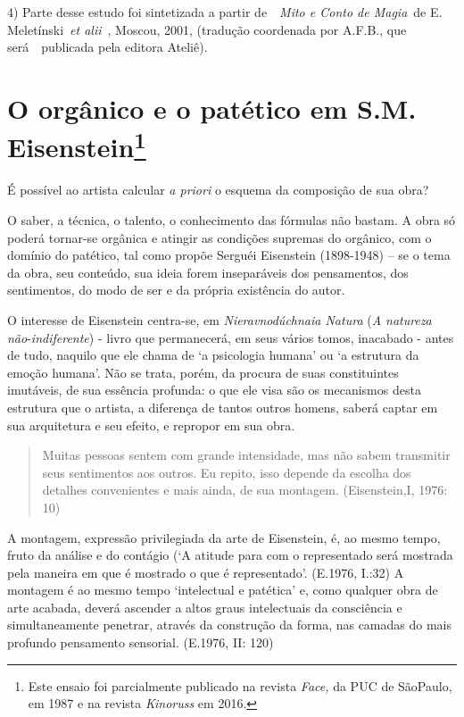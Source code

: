 4) Parte desse estudo foi sintetizada a partir de~~\emph{Mito e Conto de
Magia}~de E. Meletínski~\emph{et alii}~, Moscou, 2001, (tradução
coordenada por A.F.B., que será~~publicada pela editora Ateliê).

\chapter{O orgânico e o patético em S.M. Eisenstein\footnote{Este ensaio
  foi parcialmente publicado na revista \emph{Face,} da PUC de SãoPaulo,
  em 1987 e na revista \emph{Kinoruss} em 2016.}}

É possível ao artista calcular \emph{a priori} o esquema da composição
de sua obra?

O saber, a técnica, o talento, o conhecimento das fórmulas não bastam. A
obra só poderá tornar-se orgânica e atingir as condições supremas do
orgânico, com o domínio do patético, tal como propõe Serguéi Eisenstein
(1898-1948) -- se o tema da obra, seu conteúdo, sua ideia forem
inseparáveis dos pensamentos, dos sentimentos, do modo de ser e da
própria existência do autor.

O interesse de Eisenstein centra-se, em \emph{Nieravnodúchnaia Natura}
(\emph{A natureza não}-\emph{indiferente}) - livro que permanecerá, em
seus vários tomos, inacabado - antes de tudo, naquilo que ele chama de
`a psicologia humana' ou `a estrutura da emoção humana'. Não se trata,
porém, da procura de suas constituintes imutáveis, de sua essência
profunda: o que ele visa são os mecanismos desta estrutura que o
artista, a diferença de tantos outros homens, saberá captar em sua
arquitetura e seu efeito, e repropor em sua obra.

\begin{quote}
Muitas pessoas sentem com grande intensidade, mas não sabem transmitir
seus sentimentos aos outros. Eu repito, isso depende da escolha dos
detalhes convenientes e mais ainda, de sua montagem. (Eisenstein,I,
1976: 10)
\end{quote}

A montagem, expressão privilegiada da arte de Eisenstein, é, ao mesmo
tempo, fruto da análise e do contágio (`A atitude para com o
representado será mostrada pela maneira em que é mostrado o que é
representado'. (E.1976, I.:32) A montagem é ao mesmo tempo `intelectual
e patética' e, como qualquer obra de arte acabada, deverá ascender a
altos graus intelectuais da consciência e simultaneamente penetrar,
através da construção da forma, nas camadas do mais profundo pensamento
sensorial. (E.1976, II: 120)

